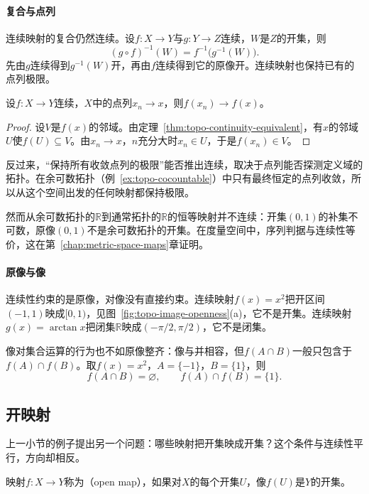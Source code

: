 \paragraph{复合与点列}
连续映射的复合仍然连续。设$f:X\to Y$与$g:Y\to Z$连续，$W$是$Z$的开集，则
\[
 (g\circ f)^{-1}(W)=f^{-1}\bigl(g^{-1}(W)\bigr).
\]
先由$g$连续得到$g^{-1}(W)$开，再由$f$连续得到它的原像开。连续映射也保持已有的点列极限。

\begin{theorem}[连续映射保持极限]
\label{thm:topo-continuous-preserves-limits}
设$f:X\to Y$连续，$X$中的点列$x_n\to x$，则$f(x_n)\to f(x)$。
\end{theorem}
\begin{proof}
设$V$是$f(x)$的邻域。由定理~\ref{thm:topo-continuity-equivalent}，有$x$的邻域$U$使$f(U)\subseteq V$。由$x_n\to x$，$n$充分大时$x_n\in U$，于是$f(x_n)\in V$。
\end{proof}

反过来，“保持所有收敛点列的极限”能否推出连续，取决于点列能否探测定义域的拓扑。在余可数拓扑（例~\ref{ex:topo-cocountable}）中只有最终恒定的点列收敛，所以从这个空间出发的任何映射都保持极限。

然而从余可数拓扑的$\mathbb R$到通常拓扑的$\mathbb R$的恒等映射并不连续：开集$(0,1)$的补集不可数，原像$(0,1)$不是余可数拓扑的开集。在度量空间中，序列判据与连续性等价，这在第~\ref{chap:metric-space-maps}章证明。

\paragraph{原像与像}
连续性约束的是原像，对像没有直接约束。连续映射$f(x)=x^2$把开区间$(-1,1)$映成$[0,1)$，见图~\ref{fig:topo-image-openness}(a)，它不是开集。连续映射$g(x)=\arctan x$把闭集$\mathbb R$映成$(-\pi/2,\pi/2)$，它不是闭集。

像对集合运算的行为也不如原像整齐：像与并相容，但$f(A\cap B)$一般只包含于$f(A)\cap f(B)$。取$f(x)=x^2$，$A=\{-1\}$，$B=\{1\}$，则
\[
 f(A\cap B)=\varnothing,\qquad f(A)\cap f(B)=\{1\}.
\]

\subsection{开映射}
\label{sec:topo-open-maps}

上一小节的例子提出另一个问题：哪些映射把开集映成开集？这个条件与连续性平行，方向却相反。

\begin{definition}[开映射]
\label{def:topo-open-map}
映射$f:X\to Y$称为（open map），如果对$X$的每个开集$U$，像$f(U)$是$Y$的开集。
\end{definition}

